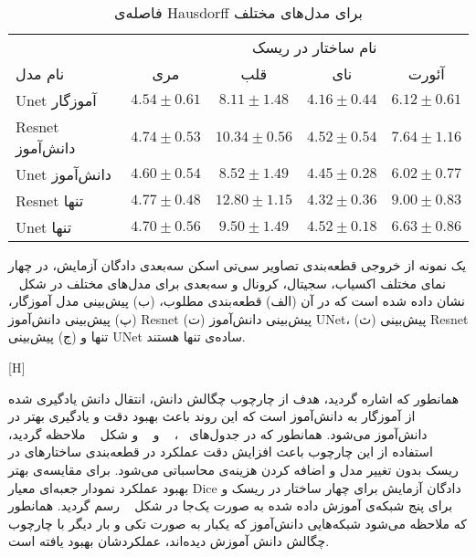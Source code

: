 \begin{table}[H]
	\caption{فاصله‌ی Hausdorff برای مدل‌های مختلف}
	\label{distillhausdorff}
	\centering
	\begin{tabular}{lcccc}
		\toprule
		\multicolumn{4}{r}{نام ساختار در ریسک} \\
		
		\cmidrule(r){2-5}
		نام مدل & مری & قلب & نای & آئورت \\
		\midrule
		Unet آموزگار & $4.54 \pm 0.61$ & $8.11 \pm 1.48$ & $4.16 \pm 0.44$ & $6.12 \pm 0.61$\\
		Resnet دانش‌آموز & $4.74 \pm 0.53$ & $10.34 \pm 0.56$ & $4.52 \pm 0.54$ & $7.64 \pm 1.16$ \\
		Unet دانش‌آموز & $4.60 \pm 0.54 $ & $8.52 \pm 1.49$ & $4.45 \pm 0.28 $ & $6.02 \pm 0.77$ \\
		\midrule
		Resnet تنها & $4.77 \pm 0.48 $ & $12.80 \pm 1.15 $ & $4.32 \pm 0.36$ & $9.00 \pm 0.83$ \\
		Unet تنها & $4.70 \pm 0.56$ & $9.50 \pm 1.49$ & $4.52 \pm 0.18$ & $6.63 \pm 0.86$ \\
		\bottomrule
	\end{tabular}
\end{table}

یک نمونه از خروجی قطعه‌بندی تصاویر سی‌تی اسکن سه‌بعدی دادگان آزمایش، در چهار نمای مختلف اکسیاب، سجیتال، کرونال و سه‌بعدی برای مدل‌های مختلف در شکل ~ نشان داده شده است که در آن (الف) قطعه‌بندی مطلوب، (ب) پیش‌بینی مدل آموزگار، (پ) پیش‌بینی دانش‌آموز Resnet (ت) پیش‌بینی دانش‌آموز UNet، (ث) پیش‌بینی Resnet تنها و (ج) پیش‌بینی UNet ساده‌ی تنها هستند.

[H]


همانطور که اشاره گردید، هدف از چارچوب چگالش دانش، انتقال دانش یادگیری شده از آموزگار به دانش‌آموز است که این‌ روند باعث بهبود دقت و یادگیری بهتر در دانش‌آموز می‌شود. همانطور که در جدول‌های ~، ~ و ~ و شکل ~ ملاحظه‌ گردید، استفاده از این چارچوب باعث افزایش دقت عملکرد در قطعه‌بندی ساختارهای در ریسک بدون تغییر مدل و اضافه کردن هزینه‌ی محاسباتی می‌شود. برای مقایسه‌ی بهتر بهبود عملکرد نمودار جعبه‌ای معیار Dice دادگان آزمایش برای چهار ساختار در ریسک و برای پنج شبکه‌ی آموزش داده شده به صورت یک‌جا در شکل ~ رسم گردید. همانطور که ملاحظه می‌شود شبکه‌هایی دانش‌آموز که یکبار به صورت تکی و بار دیگر با چارچوب چگالش دانش آموزش دیده‌اند، عملکردشان بهبود یافته است.

